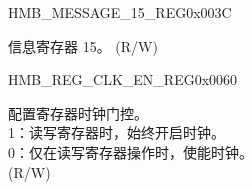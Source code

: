 \begin{register}{H}{MB\_MESSAGE\_15\_REG}{0x003C}\label{regdesc:MBMESSAGE15REG}
%
\regnewline%
\begin{regdesc}\begin{reglist}
\label{fielddesc:MBMESSAGE15}\item [MB\_MESSAGE\_15] 信息寄存器 15。 (R/W)
\end{reglist}\end{regdesc}
\end{register}


\begin{register}{H}{MB\_REG\_CLK\_EN\_REG}{0x0060}\label{regdesc:MBREGCLKENREG}
%
%
\regnewline%
\begin{regdesc}\begin{reglist}
\label{fielddesc:MBREGCLKEN}\item [MB\_REG\_CLK\_EN] 配置寄存器时钟门控。\\
1：读写寄存器时，始终开启时钟。\\
0：仅在读写寄存器操作时，使能时钟。\\ (R/W)
\end{reglist}\end{regdesc}
\end{register}


